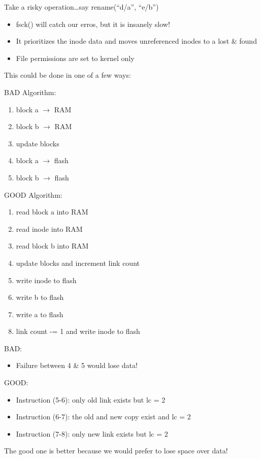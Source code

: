 \documentclass[../../lecture_notes.tex]{subfiles}
\begin{document}
Take a risky operation…say rename(“d/a”, “e/b”)
\begin{itemize}
\item fsck() will catch our erros, but it is insanely slow!
\item It prioritizes the inode data and moves unreferenced inodes to a lost \& found
\item File permissions are set to kernel only
\end{itemize}

This could be done in one of a few ways:

\begin{minipage}{0.5\linewidth}
BAD Algorithm:
\begin{enumerate}[nosep]
	\item block a $\to$ RAM
	\item block b $\to$ RAM
	\item update blocks
	\item block a $\to$ flash
	\item block b $\to$ flash
\end{enumerate}
\end{minipage}%
\begin{minipage}{0.5\linewidth}
GOOD Algorithm:
\begin{enumerate}[nosep]
	\item read block a into RAM
	\item read inode into RAM
	\item read block b into RAM
	\item update blocks and increment link count
	\item write inode to flash
	\item write b to flash
	\item write a to flash
	\item link count -= 1 and write inode to flash
\end{enumerate}
\end{minipage}


BAD: \begin{itemize}
	\item Failure between 4 \& 5 would lose data!
\end{itemize}

GOOD: \begin{itemize}
	\item Instruction (5-6): only old link exists but lc = 2
	\item Instruction (6-7): the old and new copy exist and lc = 2
	\item Instruction (7-8): only new link exists but lc = 2
\end{itemize}
The good one is better because we would prefer to lose space over data!
\end{document}
